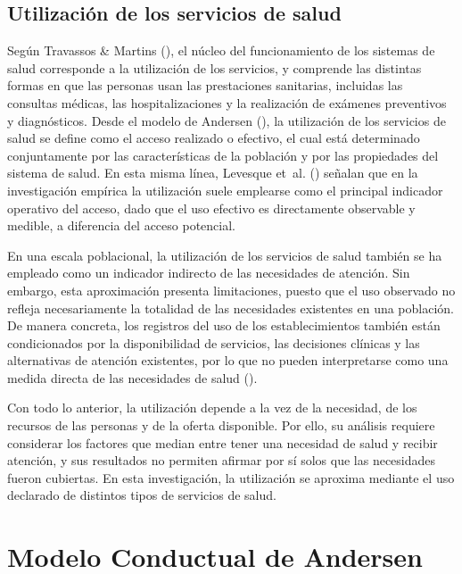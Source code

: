 \documentclass[
  spanish,
  a4paper,
  oneside]{scrbook}
\begin{document}
\subsection{Utilización de los servicios de
salud}\label{utilizaciuxf3n-de-los-servicios-de-salud}

Según Travassos \& Martins
(), el núcleo del
funcionamiento de los sistemas de salud corresponde a la utilización de
los servicios, y comprende las distintas formas en que las personas usan
las prestaciones sanitarias, incluidas las consultas médicas, las
hospitalizaciones y la realización de exámenes preventivos y
diagnósticos. Desde el modelo de Andersen
(), la utilización de los
servicios de salud se define como el acceso realizado o efectivo, el
cual está determinado conjuntamente por las características de la
población y por las propiedades del sistema de salud. En esta misma
línea, Levesque et~al.
() señalan que en la
investigación empírica la utilización suele emplearse como el principal
indicador operativo del acceso, dado que el uso efectivo es directamente
observable y medible, a diferencia del acceso potencial.

En una escala poblacional, la utilización de los servicios de salud
también se ha empleado como un indicador indirecto de las necesidades de
atención. Sin embargo, esta aproximación presenta limitaciones, puesto
que el uso observado no refleja necesariamente la totalidad de las
necesidades existentes en una población. De manera concreta, los
registros del uso de los establecimientos también están condicionados
por la disponibilidad de servicios, las decisiones clínicas y las
alternativas de atención existentes, por lo que no pueden interpretarse
como una medida directa de las necesidades de salud
().

Con todo lo anterior, la utilización depende a la vez de la necesidad,
de los recursos de las personas y de la oferta disponible. Por ello, su
análisis requiere considerar los factores que median entre tener una
necesidad de salud y recibir atención, y sus resultados no permiten
afirmar por sí solos que las necesidades fueron cubiertas. En esta
investigación, la utilización se aproxima mediante el uso declarado de
distintos tipos de servicios de salud.

\section{Modelo Conductual de
Andersen}\label{modelo-conductual-de-andersen}
\end{document}
